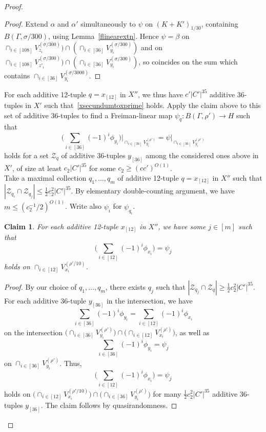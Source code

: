 \documentclass[a4paper,11pt]{article}
\numberwithin{theorem}{section}
\newtheorem{claim}[theorem]{Claim}
\theoremstyle{definition}
\begin{document}
\begin{proof}
\begin{proof}
        Extend $\alpha$ and $\alpha'$ simultaneously to $\psi$ on $(K + K')_{1/30}$, containing $B(\Gamma, \sigma/300)$, using Lemma~\ref{flinearextn}. Hence $\psi = \beta$ on $\cap_{i \in [108]} V^{(\sigma/300)}_{z_i}) \cap (\cap_{i \in [36]} V^{(\sigma/300)}_{y_i})$ and on $\cap_{i \in [108]} V^{(\sigma/300)}_{z'_i}) \cap (\cap_{i \in [36]} V^{(\sigma/300)}_{y_i})$, so coincides on the sum which contains $\cap_{i \in [36]} V^{(\sigma/3000)}_{y_i}$.
    \end{proof}

    For each additive 12-tuple $q = x_{[12]}$ in $X''$, we thus have $c'|C'|^{35}$ additive 36-tuples in $X'$ such that~\eqref{xsecundumtoxprime} holds. Apply the claim above to this set of additive 36-tuples  to find a Freiman-linear map $\psi_{q} : B(\Gamma, \rho') \to H$ such that 
        \[\Big(\sum_{i \in [36]} (-1)^i \phi_{y_i}\Big)\Big|_{\cap_{i \in [36]} V^{(\rho')}_{y_i}} = \psi|_{\cap_{i \in [36]} V^{(\rho')}_{y_i}} \]
        holds for a set $\mathcal{Z}_q$ of additive 36-tuples $y_{[36]}$ among the considered ones above in $X'$, of size at least $c_2|C'|^{35}$ for some $c_2 \geq (c c')^{O(1)} $.\\ 
    
    Take a maximal collection $q_1, \dots, q_m$ of additive 12-tuple $q = x_{[12]}$ in $X''$ such that $|\mathcal{Z}_{q_i} \cap \mathcal{Z}_{q_j}| \leq \frac{1}{2}c_2^2 |C'|^{35}$. By elementary double-counting argument, we have $m \leq (c_2^{-1}/2)^{O(1)}$. Write also $\psi_i$ for $\psi_{q_i}$.

    \begin{claim}
        For each additive 12-tuple $x_{[12]}$ in $X''$, we have some $j \in [m]$ such that 
        \[\Big(\sum_{i \in [12]} (-1)^i \phi_{x_i}\Big) = \psi_j\]
        holds on $\cap_{i \in [12]} V^{(\rho'/10)}_{x_i}$.
    \end{claim}

    \begin{proof}
        By our choice of $q_1, \dots, q_m$, there exists $q_j$ such that $|\mathcal{Z}_{q_j} \cap \mathcal{Z}_{q}| \geq \frac{1}{2}c_2^2 |C'|^{35}$. For each additive 36-tuple $y_{[36]}$ in the intersection, we have
        \[\sum_{i \in [36]} (-1)^i \phi_{y_i} = \sum_{i \in [12]} (-1)^i \phi_{x_i}\]
        on the intersection $\Big(\cap_{i \in [36]} V^{(\rho')}_{y_i}\Big) \cap \Big(\cap_{i \in [12]} V^{(\rho')}_{x_i}\Big)$, as well as 
        \[\sum_{i \in [36]} (-1)^i \phi_{y_i} = \psi_j\]
        on $\cap_{i \in [36]} V^{(\rho')}_{y_i}$. Thus, 
        \[\Big(\sum_{i \in [12]} (-1)^i \phi_{x_i}\Big) = \psi_j\]
        holds on $\Big(\cap_{i \in [12]} V^{(\rho'/10)}_{x_i}\Big) \cap \Big(\cap_{i \in [36]} V^{(\rho')}_{y_i}\Big)$ for many $ \frac{1}{2}c_2^2 |C'|^{35}$ additive 36-tuples $y_{[36]}$. The claim follows by quasirandomness.
    \end{proof}


\end{proof}
\end{document}
